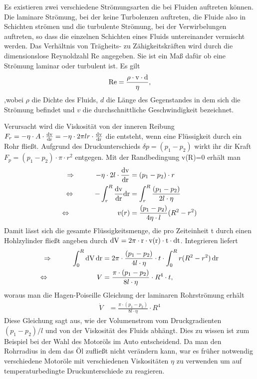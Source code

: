 \documentclass[12pt, a4paper, twoside]{scrartcl}
\begin{document}
Es existieren zwei verschiedene Strömungsarten die bei Fluiden auftreten können. Die laminare Strömung, bei der keine Turbolenzen auftreten, die Fluide also in Schichten strömen und die turbulente Strömung, bei der Verwirbelungen auftreten, so dass die einzelnen Schichten eines Fluids untereinander vermischt werden.\newline
Das Verhältnis von Trägheits- zu Zähigkeitskräften wird durch die dimensionslose  Reynoldzahl Re angegeben. Sie ist ein Maß dafür ob eine Strömung laminar oder turbulent ist. Es gilt
\begin{align*}
  \rm{Re}=\frac{\rho\cdot v\cdot d}{\eta},
\end{align*}
,wobei $\rho$ die Dichte des Fluids, $d$ die Länge des Gegenstandes in dem sich die Strömung befindet und $v$ die durchschnittliche Geschwindigkeit bezeichnet.\linebreak
 
Verursacht wird die Viskosität von der inneren Reibung $F_r=-\eta\cdot A\cdot\frac{\rm dv}{\rm dr}=-\eta\cdot 2\pi l r\cdot\frac{\rm dv}{\rm dr}$ die entsteht, wenn eine Flüssigkeit durch ein Rohr fließt. Aufgrund des Druckunterschieds $\delta p=(p_1-p_2)$ wirkt ihr dir Kraft $F_p=(p_1-p_2)\cdot\pi\cdot r^2$ entgegen. Mit der Randbedingung v(R)=0 erhält man
\begin{align*}
\Rightarrow\hspace{1cm}-\eta\cdot2 l\cdot\frac{\rm dv}{\rm dr}&=(p_1-p_2)\cdot r \\
\Leftrightarrow\hspace{1.0cm}-\int_r^R\frac{\rm dv}{\rm dr}\rm dr&=\int_r^R\frac{(p_1-p_2)}{2l\cdot\eta} \\
\Leftrightarrow\hspace{2.35cm}v(r)&=\frac{(p_1-p_2)}{4\eta\cdot l}(R^2-r^2)
\end{align*}
Damit lässt sich die gesamte Flüssigkeitsmenge, die pro Zeiteinheit t durch einen Hohlzylinder fließt angeben durch $\rm dV=2\pi\cdot r\cdot v(r)\cdot t\cdot dt$. Integrieren liefert
\begin{align*}
\Rightarrow \hspace*{1cm}\int_0^R\rm dV\,\rm dr&=2\pi\cdot\frac{(p_1-p_2)}{4l\cdot\eta}\cdot t\cdot\int_0^Rr(R^2-r^2)\,\rm dr \\
\Leftrightarrow \hspace*{2.4cm}V&=\frac{\pi\cdot(p_1-p_2)}{8l\cdot\eta}\cdot R^4\cdot t\rm,
\end{align*}
woraus man die Hagen-Poiseille Gleichung der laminaren Rohrströmung erhält
\begin{align}
\dot V&=\frac{\pi\cdot(p_1-p_2)}{8l\cdot\eta}\cdot R^4 \label{eq:viskositaet}
\end{align}
Diese Gleichung sagt aus, wie der Volumenstrom vom Druckgradienten $(p_1-p_2)/l$ und von der Viskosität des Fluids abhängt. Dies zu wissen ist zum Beispiel bei der Wahl des Motoröls im Auto entscheidend. Da man den Rohrradius in dem das Öl zufließt nicht verändern kann, war es früher notwendig verschiedene Motoröle mit verschiedenen Viskositäten $\eta$ zu verwenden um auf temperaturbedingte Druckunterschiede zu reagieren.\\
\end{document}
